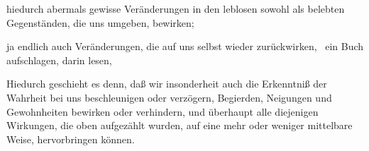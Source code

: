 \begin{aufza}
\begin{aufzb}
\begin{aufzc}
\item hiedurch abermals gewisse Veränderungen in den leblosen sowohl als belebten Gegenständen, die uns umgeben, bewirken;
\item ja endlich auch Veränderungen, die auf uns selbst wieder zurückwirken, \zB\  ein Buch aufschlagen, darin lesen, \udgl\ 
\item Hiedurch geschieht es denn, daß wir insonderheit auch die Erkenntniß der Wahrheit bei uns beschleunigen oder verzögern, Begierden, Neigungen und Gewohnheiten bewirken oder verhindern, und überhaupt alle diejenigen Wirkungen, die oben aufgezählt wurden, auf eine mehr oder weniger mittelbare Weise, hervorbringen können.
\end{aufzc}
\end{aufzb}
\end{aufza}

